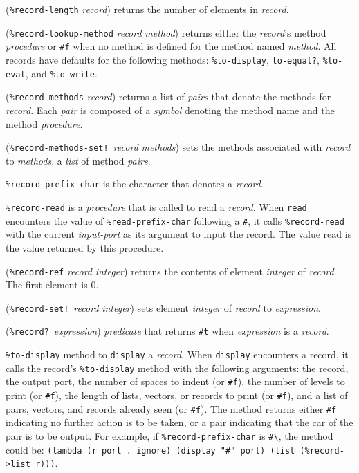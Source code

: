 \documentclass[10pt,twocolumn]{article}
\begin{document}
(\texttt{\%record-length} \emph{record}) returns the number of elements
in \emph{record}.

(\texttt{\%record-lookup-method} \emph{record} \emph{method}) returns
either the \emph{record}'s method \emph{procedure} or \texttt{\#f} when no method is
defined for the method named \emph{method}.  All records have
defaults for the following methods: 
\texttt{\%to-display}, \texttt{to-equal?}, \texttt{\%to-eval}, and \texttt{\%to-write}.  

(\texttt{\%record-methods} \emph{record}) returns a list of \emph{pairs}
that denote the methods for \emph{record}.  Each \emph{pair} is composed of a
\emph{symbol} denoting the method name and the method \emph{procedure}.

(\texttt{\%record-methods-set!}\ \emph{record} \emph{methods}) sets the
methods associated with \emph{record} to \emph{methods}, a \emph{list} of method
\emph{pairs}.

\texttt{\%record-prefix-char} is the character that denotes a
\emph{record}.

\texttt{\%record-read} is a \emph{procedure} that is called to read a
\emph{record}. When \texttt{read} encounters the value of
\texttt{\%read-prefix-char} following a \texttt{\#}, it calls
\texttt{\%record-read} with the current \emph{input-port} as its
argument to input the record.  The value read is the value
returned by this procedure.

(\texttt{\%record-ref} \emph{record} \emph{integer}) returns the contents of element
\emph{integer} of \emph{record}.  The first element is 0.

(\texttt{\%record-set!}\ \emph{record} \emph{integer}) sets element
\emph{integer} of \emph{record} to \emph{expression}.

(\texttt{\%record?}\ \emph{expression}) \emph{predicate} that returns
\texttt{\#t} when \emph{expression} is a \emph{record}.

\texttt{\%to-display} method to \texttt{display} a \emph{record}.  When
\texttt{display} encounters a record, it calls the record's
\texttt{\%to-display} method with the following arguments:  the
record, the output port, the number of spaces to indent (or
\texttt{\#f}), the number of levels to print (or \texttt{\#f}), the length
of lists, vectors, or records to print (or \texttt{\#f}), and a list
of pairs, vectors, and records already seen (or \texttt{\#f}).  The
method returns either \texttt{\#f} indicating no further action is
to be taken, or a pair indicating that the car of the pair
is to be output.  For example, if \texttt{\%record-prefix-char} is
\texttt{\#\textbackslash\texttildelow}, the method could be: \texttt{(lambda (r port .\ ignore)
(display "\#\texttildelow" port) (list (\%record->list r)))}.
\end{document}
